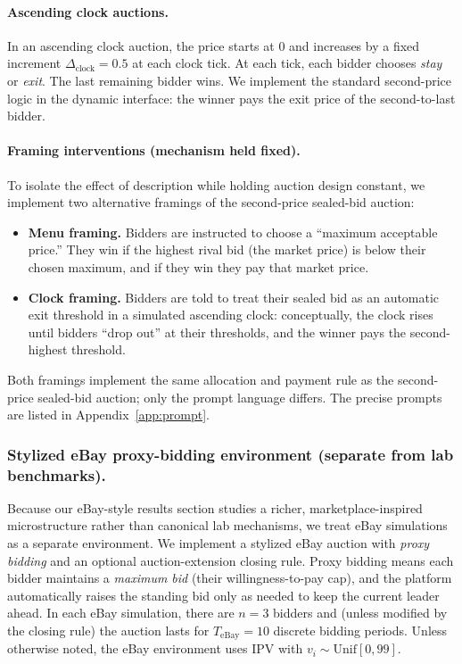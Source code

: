 \paragraph{Ascending clock auctions.}
In an ascending clock auction, the price starts at 0 and increases by a fixed increment $\Delta_{\text{clock}}=0.5$ at each clock tick. At each tick, each bidder chooses \emph{stay} or \emph{exit}. The last remaining bidder wins. We implement the standard second-price logic in the dynamic interface: the winner pays the exit price of the second-to-last bidder.

\paragraph{Framing interventions (mechanism held fixed).}
To isolate the effect of description while holding auction design constant, we implement two alternative framings of the second-price sealed-bid auction:
\begin{itemize}
    \item \textbf{Menu framing.} Bidders are instructed to choose a ``maximum acceptable price.'' They win if the highest rival bid (the market price) is below their chosen maximum, and if they win they pay that market price.
    \item \textbf{Clock framing.} Bidders are told to treat their sealed bid as an automatic exit threshold in a simulated ascending clock: conceptually, the clock rises until bidders ``drop out'' at their thresholds, and the winner pays the second-highest threshold.
\end{itemize}
Both framings implement the same allocation and payment rule as the second-price sealed-bid auction; only the prompt language differs. The precise prompts are listed in Appendix~\ref{app:prompt}.

\subsubsection{Stylized eBay proxy-bidding environment (separate from lab benchmarks).}
Because our eBay-style results section studies a richer, marketplace-inspired microstructure rather than canonical lab mechanisms, we treat eBay simulations as a separate environment. We implement a stylized eBay auction with \emph{proxy bidding} and an optional auction-extension closing rule. Proxy bidding means each bidder maintains a \emph{maximum bid} (their willingness-to-pay cap), and the platform automatically raises the standing bid only as needed to keep the current leader ahead. In each eBay simulation, there are $n=3$ bidders and (unless modified by the closing rule) the auction lasts for $T_{\text{eBay}}=10$ discrete bidding periods. Unless otherwise noted, the eBay environment uses IPV with $v_i \sim \mathrm{Unif}[0,99]$.

